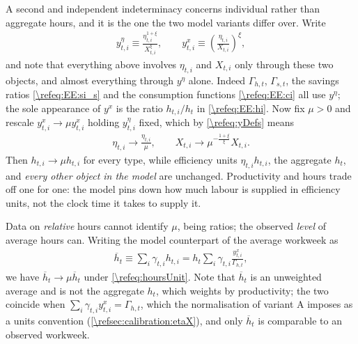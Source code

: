 A second and independent indeterminacy concerns individual rather than aggregate hours, and it is the one the two model variants differ over. Write
\begin{align}\label{\refeq:yDefs}
    y_{t,i}^{\eta}\equiv \frac{\eta_{t,i}^{1+\xi}}{X_{t,i}^{\xi}}, \qquad y_{t,i}^{x}\equiv \left(\frac{\eta_{t,i}}{X_{t,i}}\right)^{\xi},
\end{align}
and note that everything above involves $\eta_{t,i}$ and $X_{t,i}$ only through these two objects, and almost everything through $y^{\eta}$ alone. Indeed $\Gamma_{h,t}$, $\Gamma_{s,t}$, the savings ratios \eqref{\refeq:EE:si_s} and the consumption functions \eqref{\refeq:EE:ci} all use $y^{\eta}$; the sole appearance of $y^x$ is the ratio $h_{t,i}/h_t$ in \eqref{\refeq:EE:hi}. Now fix $\mu>0$ and rescale $y_{t,i}^x\rightarrow\mu y_{t,i}^x$ holding $y_{t,i}^{\eta}$ fixed, which by \eqref{\refeq:yDefs} means
\begin{align}\label{\refeq:hoursUnit}
    \eta_{t,i}\rightarrow \frac{\eta_{t,i}}{\mu}, \qquad X_{t,i}\rightarrow \mu^{-\frac{1+\xi}{\xi}}X_{t,i}.
\end{align}
Then $h_{t,i}\rightarrow\mu h_{t,i}$ for every type, while efficiency units $\eta_{t,i}h_{t,i}$, the aggregate $h_t$, and \emph{every other object in the model} are unchanged. Productivity and hours trade off one for one: the model pins down how much labour is supplied in efficiency units, not the clock time it takes to supply it.

Data on \emph{relative} hours cannot identify $\mu$, being ratios; the observed \emph{level} of average hours can. Writing the model counterpart of the average workweek as
\begin{align}\label{\refeq:avgHours}
    \overline{h}_t \equiv \sum_i\gamma_{t,i}h_{t,i} = h_t\sum_i\gamma_{t,i}\frac{y_{t,i}^x}{\Gamma_{h,t}},
\end{align}
we have $\overline{h}_t\rightarrow\mu\overline{h}_t$ under \eqref{\refeq:hoursUnit}. Note that $\overline{h}_t$ is an unweighted average and is not the aggregate $h_t$, which weights by productivity; the two coincide when $\sum_i\gamma_{t,i}y_{t,i}^x = \Gamma_{h,t}$, which the normalisation of variant A imposes as a units convention (\cref{\refsec:calibration:etaX}), and only $\overline{h}_t$ is comparable to an observed workweek.



